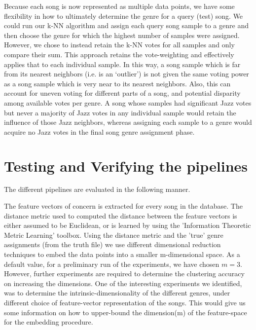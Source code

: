 \documentclass[10pt]{article}
\begin{document}
Because each song is now represented as multiple data points, we have some flexibility in how to ultimately determine the genre for a query (test) song.  We could run our k-NN algorithm and assign each query song sample to a genre and then choose the genre for which the highest number of samples were assigned.  However, we chose to instead retain the k-NN votes for all samples and only compare their sum.  This approach retains the vote-weighting and effectively applies that to each individual sample. In this way, a song sample which is far from its nearest neighbors (i.e. is an ‘outlier’) is not given the same voting power as a song sample which is very near to its nearest neighbors.  Also, this can account for uneven voting for different parts of a song, and potential disparity among available votes per genre.  A song whose samples had significant Jazz votes but never a majority of Jazz votes in any individual sample would retain the influence of those Jazz neighbors, whereas assigning each sample to a genre would acquire no Jazz votes in the final song genre assignment phase.

\section{Testing and Verifying the pipelines}

The different pipelines are evaluated in the following manner. 

The feature vectors of concern is extracted for every song in the database. The distance metric used to computed the distance between the feature vectors is either assumed to be Euclidean, or is learned by using the 'Information Theoretic Metric Learning' \cite{infoTheoryMetricLearning} toolbox. Using the distance metric and the 'true' genre assignments (from the truth file) we use different dimensional reduction techniques to embed the data points into a smaller m-dimensional space. As a default value, for a preliminary run of the experiments, we have chosen $m = 3$. However, further experiments are required to determine the clustering accuracy on increasing the dimensions. One of the interesting experiments we identified, was to determine the intrinsic-dimensionality of the different genres, under different choice of feature-vector representation of the songs. This would give us some information on how to upper-bound the dimension(m) of the feature-space for the embedding procedure.
\end{document}
